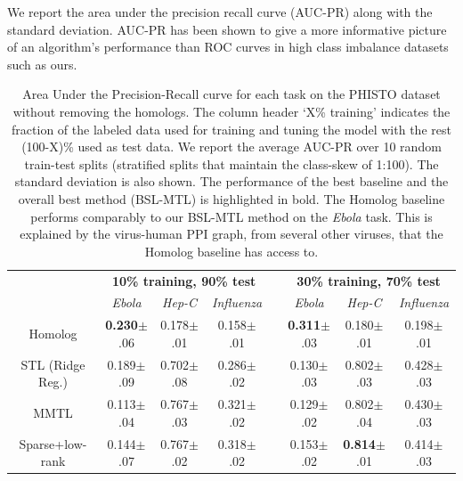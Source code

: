 \documentclass{bioinfo}
\begin{document}
We report the area under the precision recall curve (AUC-PR) along with the standard deviation. 
AUC-PR has been shown to give a more informative picture of an algorithm's performance than ROC curves in high class imbalance datasets \citep{davis2006} such as ours. 


\begin{table}[t]\caption{Area Under the Precision-Recall curve for each task on the PHISTO dataset without removing the homologs. The column header `X\% training' indicates the fraction of the labeled data used for training and tuning the model with the rest (100-X)\% used as test data. We report the average AUC-PR over 10 random train-test splits (stratified splits that maintain the class-skew of 1:100). The standard deviation is also shown. The performance of the best baseline and the overall best method (BSL-MTL) is highlighted in bold. The Homolog baseline performs comparably to our BSL-MTL method on the \textit{Ebola} task. This is explained by the virus-human PPI graph, from several other viruses, that the Homolog baseline has access to.}
\label{resultsTable}
\begin{small}
\begin{center}
\def\arraystretch{1.2}
\begin{tabular}{c|ccccccc}
\toprule
& \multicolumn{3}{c}{\textbf{10\% training, 90\% test}} && \multicolumn{3}{c}{\textbf{30\% training, 70\% test}} \\ \cline{2-4}\cline{6-8}
& \textit{Ebola} & \textit{Hep-C} & \textit{Influenza} && \textit{Ebola} & \textit{Hep-C} & \textit{Influenza} \\ \midrule
Homolog & \textbf{0.230}$\pm$.06 & 0.178$\pm$.01 & 0.158$\pm$.01 && \textbf{0.311}$\pm$.03 & 0.180$\pm$.01 & 0.198$\pm$.01 \\
STL (Ridge Reg.)  & 0.189$\pm$.09 & 0.702$\pm$.08 & 0.286$\pm$.02 && 0.130$\pm$.03 & 0.802$\pm$.03 & 0.428$\pm$.03 \\ 
MMTL \citep{pontil04} & 0.113$\pm$.04 & 0.767$\pm$.03 & 0.321$\pm$.02 && 0.129$\pm$.02 & 0.802$\pm$.04 & 0.430$\pm$.03  \\ 
Sparse+low-rank \citep{chen2012} & 0.144$\pm$.07 & 0.767$\pm$.02 & 0.318$\pm$.02 && 0.153$\pm$.02 & \textbf{0.814}$\pm$.01 & 0.414$\pm$.03  \\ 

\end{tabular}
\end{center}
\end{small}
\end{table}
\end{document}
